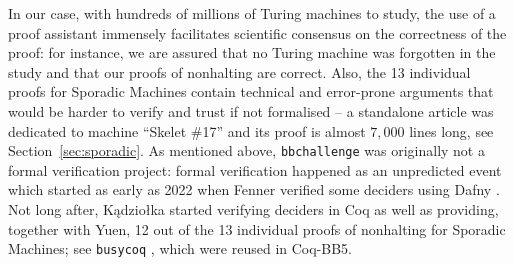\documentclass[a4paper,british]{article}
\theoremstyle{definition} %
\numberwithin{equation}{section}
\theoremstyle{definition} %
\newcommand{\CoqBB}{Coq-BB5\xspace}
\begin{document}

In our case, with hundreds of millions of Turing machines to study, the use of a proof assistant immensely facilitates scientific consensus on the correctness of the proof: for instance, we are assured that no Turing machine was forgotten in the study and that our proofs of nonhalting are correct. Also, the 13 individual proofs for Sporadic Machines contain technical and error-prone arguments that would be harder to verify and trust if not formalised -- \eg a standalone article was dedicated to machine ``Skelet \#17'' \cite{xu2024skelet17fifthbusy} and its \Coq proof is almost $7{,}000$ lines long, see Section~\ref{sec:sporadic}. As mentioned above, \texttt{bbchallenge} was originally not a formal verification project: formal verification happened as an unpredicted event which started as early as 2022 when Fenner verified some deciders using Dafny \cite{dafny_fenner, Dafny}. Not long after, Kądziołka started verifying deciders in Coq as well as providing, together with Yuen, 12 out of the 13 individual proofs of nonhalting for Sporadic Machines; see  \texttt{busycoq} \cite{busycoq}, which were reused in \CoqBB.
\end{document}
